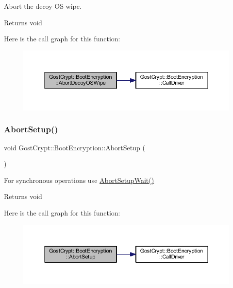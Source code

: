 Abort the decoy OS wipe. 

\begin{DoxyReturn}{Returns}
void 
\end{DoxyReturn}
Here is the call graph for this function\+:
\nopagebreak
\begin{figure}[H]
\begin{center}
\leavevmode
\includegraphics[width=350pt]{class_gost_crypt_1_1_boot_encryption_a8933f34e2803ba68a3c980cc01519c11_cgraph}
\end{center}
\end{figure}
\mbox{\label{class_gost_crypt_1_1_boot_encryption_a8396cfba92f8b27ed9456e08ddb7be2b}} 
\subsubsection{\texorpdfstring{Abort\+Setup()}{AbortSetup()}}
{\footnotesize\ttfamily void Gost\+Crypt\+::\+Boot\+Encryption\+::\+Abort\+Setup (\begin{DoxyParamCaption}{ }\end{DoxyParamCaption})}



For synchronous operations use \hyperlink{class_gost_crypt_1_1_boot_encryption_a43e9a83c907891f63e2f5b2a891471be}{Abort\+Setup\+Wait()} 

\begin{DoxyReturn}{Returns}
void 
\end{DoxyReturn}
Here is the call graph for this function\+:
\nopagebreak
\begin{figure}[H]
\begin{center}
\leavevmode
\includegraphics[width=350pt]{class_gost_crypt_1_1_boot_encryption_a8396cfba92f8b27ed9456e08ddb7be2b_cgraph}
\end{center}
\end{figure}
\mbox{\label{class_gost_crypt_1_1_boot_encryption_a43e9a83c907891f63e2f5b2a891471be}} 
